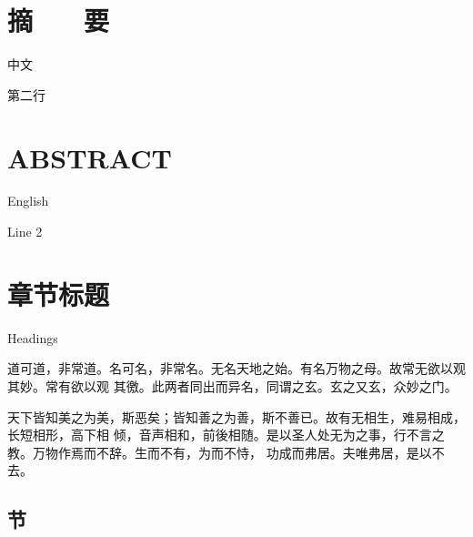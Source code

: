 \documentclass[a4paper, twoside, openany, extrafontsizes]{dlutthesis}
\begin{document}
\maketitle

\cleardoublepage
\makedeclaration

\frontmatter

\cleardoublepage
\chapter*{摘　　要}

中文

第二行


\cleardoublepage
\chapter*{ABSTRACT}

English

Line 2


\cleardoublepage
\tableofcontents*

\cleardoublepage
\tableofencontents*

\cleardoublepage
\listoffigures*

\vspace{3em}
\listoftables*

\mainmatter

\chapter{章节标题}{Headings}

道可道，非常道。名可名，非常名。无名天地之始。有名万物之母。故常无欲以观其妙。常有欲以观
其徼。此两者同出而异名，同谓之玄。玄之又玄，众妙之门。

天下皆知美之为美，斯恶矣；皆知善之为善，斯不善已。故有无相生，难易相成，长短相形，高下相
倾，音声相和，前後相随。是以圣人处无为之事，行不言之教。万物作焉而不辞。生而不有，为而不恃，
功成而弗居。夫唯弗居，是以不去。

\section{节}
%
\label{sec:section}
\end{document}
